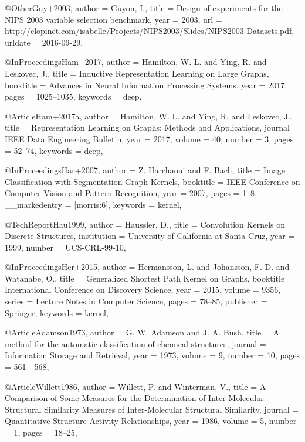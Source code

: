 @Other{Guy+2003,
  author  = {Guyon, I.},
  title   = {{Design of experiments for the NIPS 2003 variable selection benchmark}},
  year    = {2003},
  url     = {http://clopinet.com/isabelle/Projects/NIPS2003/Slides/NIPS2003-Datasets.pdf},
  urldate = {2016-09-29},
}

@InProceedings{Ham+2017,
  author    = {Hamilton, W. L. and Ying, R. and Leskovec, J.},
  title     = {Inductive Representation Learning on Large Graphs},
  booktitle = {Advances in Neural Information Processing Systems},
  year      = {2017},
  pages     = {1025--1035},
  keywords  = {deep},
}

@Article{Ham+2017a,
  author   = {Hamilton, W. L. and Ying, R. and Leskovec, J.},
  title    = {Representation Learning on Graphs: Methods and Applications},
  journal  = {{IEEE} Data Engineering Bulletin},
  year     = {2017},
  volume   = {40},
  number   = {3},
  pages    = {52--74},
  keywords = {deep},
}

@InProceedings{Har+2007,
  author        = {Z. Harchaoui and F. Bach},
  title         = {Image Classification with Segmentation Graph Kernels},
  booktitle     = {IEEE Conference on Computer Vision and Pattern Recognition},
  year          = {2007},
  pages         = {1--8},
  __markedentry = {[morris:6]},
  keywords      = {kernel},
}

@TechReport{Hau1999,
  author      = {Haussler, D.},
  title       = {Convolution Kernels on Discrete Structures},
  institution = {University of California at Santa Cruz},
  year        = {1999},
  number      = {UCS-CRL-99-10},
}

@InProceedings{Her+2015,
  author    = {Hermansson, L. and Johansson, F. D. and Watanabe, O.},
  title     = {Generalized Shortest Path Kernel on Graphs},
  booktitle = {International Conference on Discovery Science},
  year      = {2015},
  volume    = {9356},
  series    = {Lecture Notes in Computer Science},
  pages     = {78--85},
  publisher = {Springer},
  keywords  = {kernel},
}

@Article{Adamson1973,
  author  = {G. W. Adamson and J. A. Bush},
  title   = {A method for the automatic classification of chemical structures},
  journal = {Information Storage and Retrieval},
  year    = {1973},
  volume  = {9},
  number  = {10},
  pages   = {561 - 568},
}

@Article{Willett1986,
  author  = {Willett, P. and Winterman, V.},
  title   = {A Comparison of Some Measures for the Determination of Inter-Molecular Structural Similarity Measures of Inter-Molecular Structural Similarity},
  journal = {Quantitative Structure-Activity Relationships},
  year    = {1986},
  volume  = {5},
  number  = {1},
  pages   = {18--25},
}

